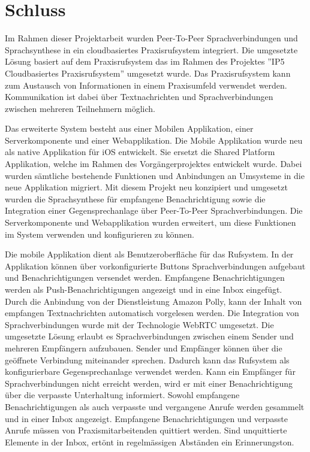 \section{Schluss}

Im Rahmen dieser Projektarbeit wurden Peer-To-Peer Sprachverbindungen und Sprachsynthese in ein cloudbasiertes Praxisrufsystem integriert.
Die umgesetzte Lösung basiert auf dem Praxisrufsystem das im Rahmen des Projektes ''IP5 Cloudbasiertes Praxisrufsystem'' umgesetzt wurde.
Das Praxisrufsystem kann zum Austausch von Informationen in einem Praxisumfeld verwendet werden.
Kommunikation ist dabei über Textnachrichten und Sprachverbindungen zwischen mehreren Teilnehmern möglich.

Das erweiterte System besteht aus einer Mobilen Applikation, einer Serverkomponente und einer Webapplikation.
Die Mobile Applikation wurde neu als native Applikation für iOS entwickelt.
Sie ersetzt die Shared Platform Applikation, welche im Rahmen des Vorgängerprojektes entwickelt wurde.
Dabei wurden sämtliche bestehende Funktionen und Anbindungen an Umsysteme in die neue Applikation migriert.
Mit diesem Projekt neu konzipiert und umgesetzt wurden die Sprachsynthese für empfangene Benachrichtigung sowie die Integration einer Gegensprechanlage über Peer-To-Peer Sprachverbindungen.
Die Serverkomponente und Webapplikation wurden erweitert, um diese Funktionen im System verwenden und konfigurieren zu können.

Die mobile Applikation dient als Benutzeroberfläche für das Rufsystem.
In der Applikation können über vorkonfigurierte Buttons Sprachverbindungen aufgebaut und Benachrichtigungen versendet werden.
Empfangene Benachrichtigungen werden als Push-Benachrichtigungen angezeigt und in eine Inbox eingefügt.
Durch die Anbindung von der Dienstleistung Amazon Polly, kann der Inhalt von empfangen Textnachrichten automatisch vorgelesen werden.
Die Integration von Sprachverbindungen wurde mit der Technologie WebRTC umgesetzt.
Die umgesetzte Lösung erlaubt es Sprachverbindungen zwischen einem Sender und mehreren Empfängern aufzubauen.
Sender und Empfänger können über die geöffnete Verbindung miteinander sprechen.
Dadurch kann das Rufsystem als konfigurierbare Gegensprechanlage verwendet werden.
Kann ein Empfänger für Sprachverbindungen nicht erreicht werden, wird er mit einer Benachrichtigung über die verpasste Unterhaltung informiert.
Sowohl empfangene Benachrichtigungen als auch verpasste und vergangene Anrufe werden gesammelt und in einer Inbox angezeigt.
Empfangene Benachrichtigungen und verpasste Anrufe müssen von Praxismitarbeitenden quittiert werden.
Sind unquittierte Elemente in der Inbox, ertönt in regelmässigen Abständen ein Erinnerungston.

